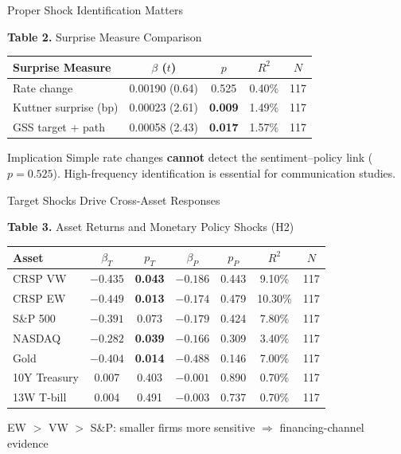 \documentclass[aspectratio=169, 11pt]{beamer}
\begin{document}
\begin{frame}{Proper Shock Identification Matters}
\begin{center}
{\small \textbf{Table 2.} Surprise Measure Comparison}
\end{center}
\vspace{0.2em}
\begin{center}
{\small
\begin{tabular}{lcccc}
\toprule
Surprise Measure & $\beta$ ($t$) & $p$ & $R^2$ & $N$ \\
\midrule
Rate change & 0.00190 (0.64) & 0.525 & 0.40\% & 117 \\
Kuttner surprise (bp) & 0.00023 (2.61) & \textbf{0.009} & 1.49\% & 117 \\
GSS target + path & 0.00058 (2.43) & \textbf{0.017} & 1.57\% & 117 \\
\bottomrule
\end{tabular}
}
\end{center}

\vspace{0.4em}
\begin{ablock}{Implication}
Simple rate changes \textbf{cannot} detect the sentiment--policy link ($p = 0.525$). High-frequency identification is essential for communication studies.
\end{ablock}
\end{frame}

\begin{frame}{Target Shocks Drive Cross-Asset Responses}
\begin{center}
{\small \textbf{Table 3.} Asset Returns and Monetary Policy Shocks (H2)}
\end{center}
\vspace{0.2em}
\begin{center}
{\footnotesize
\begin{tabular}{lcccccc}
\toprule
Asset & $\beta_T$ & $p_T$ & $\beta_P$ & $p_P$ & $R^2$ & $N$ \\
\midrule
CRSP VW & $-0.435$ & \textbf{0.043} & $-0.186$ & 0.443 & 9.10\% & 117 \\
CRSP EW & $-0.449$ & \textbf{0.013} & $-0.174$ & 0.479 & 10.30\% & 117 \\
S\&P 500 & $-0.391$ & 0.073 & $-0.179$ & 0.424 & 7.80\% & 117 \\
NASDAQ & $-0.282$ & \textbf{0.039} & $-0.166$ & 0.309 & 3.40\% & 117 \\
Gold & $-0.404$ & \textbf{0.014} & $-0.488$ & 0.146 & 7.00\% & 117 \\
10Y Treasury & 0.007 & 0.403 & $-0.001$ & 0.890 & 0.70\% & 117 \\
13W T-bill & 0.004 & 0.491 & $-0.003$ & 0.737 & 0.70\% & 117 \\
\bottomrule
\end{tabular}
}
\end{center}

\vspace{0.2em}
{\small EW $>$ VW $>$ S\&P: smaller firms more sensitive $\Rightarrow$ financing-channel evidence}
\end{frame}
\end{document}
